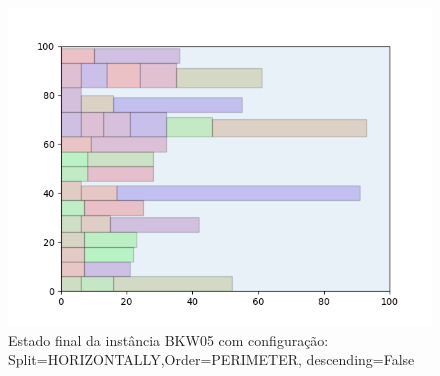 \begin{figure}[H]
    \centering
    \caption[]{Estado final da instância BKW05 com configuração: Split=HORIZONTALLY,Order=PERIMETER, descending=False}
    \label{fig:bkw05-horizontally-perimeter-false}
    \includegraphics[scale=0.5]{output/figures/bkw/bkw05/horizontally/perimeter/false/00}
\end{figure}